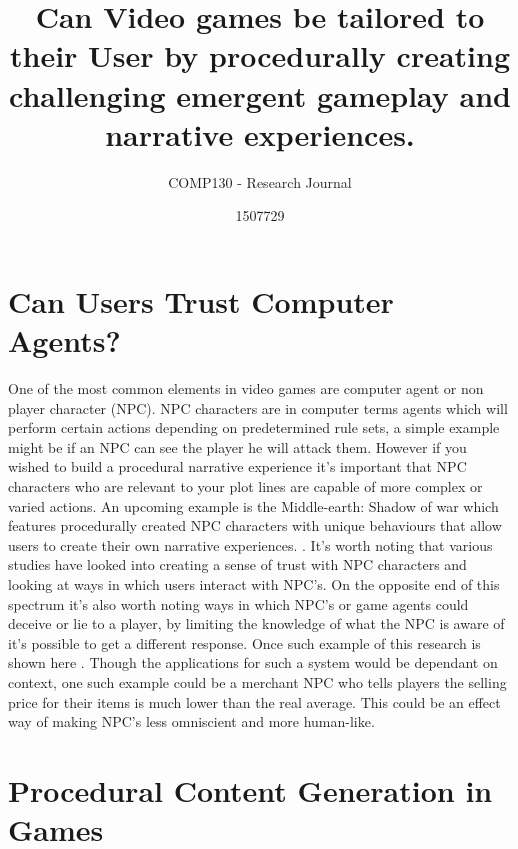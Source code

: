 \documentclass{scrartcl}
\title{Can Video games be tailored to their User by procedurally creating challenging emergent gameplay and narrative experiences.}
\subtitle{COMP130 - Research Journal}
\author{1507729}
\begin{document}
\maketitle


\section{Can Users Trust Computer Agents?}

One of the most common elements in video games are computer agent or non player character (NPC). NPC characters are in computer terms agents which will perform certain actions depending on predetermined rule sets, a simple example might be if an NPC can see the player he will attack them. However if you wished to build a procedural narrative experience it's important that NPC characters who are relevant to your plot lines are capable of more complex or varied actions. An upcoming example is the Middle-earth: Shadow of war which features procedurally created NPC characters with unique behaviours that allow users to create their own narrative experiences. \cite{monolith2017shadow}. It's worth noting that various studies have looked into creating a sense of trust with NPC characters and looking at ways in which users interact with NPC's. \cite{do2016trust} \cite{granatyr2015trust} On the opposite end of this spectrum it's also worth noting ways in which NPC's or game agents could deceive or lie to a player, by limiting the knowledge of what the NPC is aware of it's possible to get a different response. Once such example of this research is shown here \cite{cowling2015emergent}. Though the applications for such a system would be dependant on context, one such example could be a merchant NPC who tells players the selling price for their items is much lower than the real average. This could be an effect way of making NPC's less omniscient and more human-like.

\section{Procedural Content Generation in Games}
\end{document}
